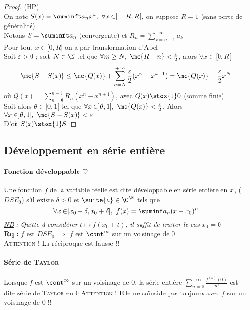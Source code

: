 		\begin{proof} (HP)\\
		On note $S(x) = \suminft a_nx^n ,~\forall x\in ]-R,R[$, on suppose $R=1$ (sans perte de généralité)\\
		Notons $S=\suminft a_n$ (convergente) et $R_n = \sum_{k=n+1}^{+\infty} a_k$\\
		Pour tout $x\in[0,R[$ on a par transformation d'Abel \vspace*{0.3cm}\\
		Soit $\varepsilon >0$ ; soit $N\in\N$ tel que $\forall m\geq N ,~\mc{R-n}<\frac{\varepsilon}{2}$, alors $\forall x\in[0,R[$ 
		\[ \mc{S-S(x)} \leq \mc{Q(x)} + \sum_{n=N}^{+\infty} \frac{\varepsilon}{2} (x^n - x^{n+1}) = \mc{Q(x)} + \frac{\varepsilon}{2} x^N \] 
		où $Q(x) = \sum_{n=0}^{n-1} R_n(x^n - x^{n+1})$, avec $Q(x) \stox{1} 0$ (somme finie) \vspace*{0.2cm} \\
		Soit alors $\theta \in [0,1[$ tel que $\forall x\in ]\theta,1[ ,~ \mc{Q(x)} <\frac{\varepsilon}{2}$. Alors $\forall x\in ]\theta,1[,~ \mc{S-S(x)} <\varepsilon$ \vspace*{0.2cm} \\
		D'où $S(x) \stox{1} S$
		\end{proof}
	\subsection{Développement en série entière}
		\traitd
		\paragraph{Fonction développable $\heartsuit$}
			Une fonction $f$ de la variable réelle est dite \uline{développable en série entière en $x_0$} ($DSE_0$) s'il existe $\delta>0$ et $\suite{a}\in\C^\N$ tels que \[ \forall x\in ]x_0-\delta , x_0+\delta[ ,~ f(x) = \suminf a_n(x-x_0)^n \]\trait
		\textit{\uline{NB} : Quitte à considérer $t\mapsto f(x_0+t)$, il suffit de traiter le cas $x_0 = 0$}\\
		\textbf{\uline{Rq} :} $f$ est $DSE_0$ $\Rightarrow$ $f$ est $\cont^{\infty}$ sur un voisinage de $0$ \\\textsc{Attention !} La réciproque est fausse !! \newpage \traitd
		\paragraph{Série de \textsc{Taylor}}
			Lorsque $f$ est $\cont^{\infty}$ sur un voisinage de $0$, la série entière $\sum_{n=0}^{+\infty} \frac{f^{(n)}(0)}{n!}$ est dite \uline{série de \textsc{Taylor} en $0$} \trait
		\textsc{Attention !} Elle ne coïncide pas toujours avec $f$ sur un voisinage de $0$ !!\\
		\traitd
